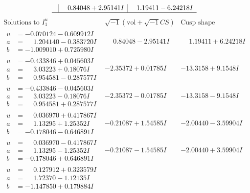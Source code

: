 \documentclass[1p]{elsarticle_modified}
\theoremstyle{definition}
\newcommand{\I}{\sqrt{-1}}
\begin{document}
$$\begin{array}{c|c|c}
 & \phantom{-}0.84048 + 2.95141 I & \phantom{-}1.19411 - 6.24218 I\\
 \hline 
 \end{array}$$\newpage$$\begin{array}{c|c|c}  
\text{Solutions to }I^u_{1}& \I (\text{vol} + \sqrt{-1}CS) & \text{Cusp shape}\\
 \hline 
\begin{aligned}
u &= -0.070124 - 0.609912 I \\
a &= \phantom{-}1.204140 - 0.383720 I \\
b &= -1.009010 + 0.725980 I\end{aligned}
 & \phantom{-}0.84048 - 2.95141 I & \phantom{-}1.19411 + 6.24218 I \\ \hline\begin{aligned}
u &= -0.433846 + 0.045603 I \\
a &= \phantom{-}3.03223 + 0.18076 I \\
b &= \phantom{-}0.954581 - 0.287577 I\end{aligned}
 & -2.35372 + 0.01785 I & -13.3158 + 9.1548 I \\ \hline\begin{aligned}
u &= -0.433846 - 0.045603 I \\
a &= \phantom{-}3.03223 - 0.18076 I \\
b &= \phantom{-}0.954581 + 0.287577 I\end{aligned}
 & -2.35372 - 0.01785 I & -13.3158 - 9.1548 I \\ \hline\begin{aligned}
u &= \phantom{-}0.036970 + 0.417867 I \\
a &= \phantom{-}1.13295 + 1.25352 I \\
b &= -0.178046 - 0.646891 I\end{aligned}
 & -0.21087 + 1.54585 I & -2.00440 - 3.59904 I \\ \hline\begin{aligned}
u &= \phantom{-}0.036970 - 0.417867 I \\
a &= \phantom{-}1.13295 - 1.25352 I \\
b &= -0.178046 + 0.646891 I\end{aligned}
 & -0.21087 - 1.54585 I & -2.00440 + 3.59904 I \\ \hline\begin{aligned}
u &= \phantom{-}0.127912 + 0.323579 I \\
a &= \phantom{-}1.72370 - 1.12135 I \\
b &= -1.147850 + 0.179884 I\end{aligned}

\end{array}$$
\end{document}
